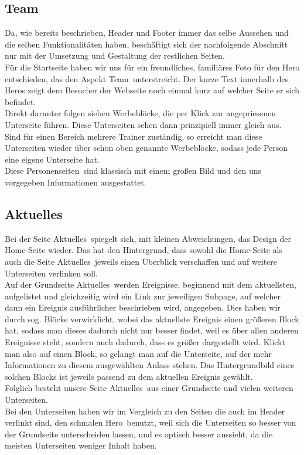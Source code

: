 \documentclass[12pt,a4paper]{article}
\begin{document}
\subsection{Team}
Da, wie bereits beschrieben, Header und Footer immer das selbe Aussehen und die selben Funktionalitäten haben, beschäftigt sich der nachfolgende Abschnitt nur mit der Umsetzung und Gestaltung der restlichen Seiten.\\
Für die Startseite haben wir uns für ein freundliches, familiäres Foto für den Hero entschieden, das den Aspekt \dq Team\dq \ unterstreicht.
Der kurze Text innerhalb des Heros zeigt dem Besucher der Webseite noch einmal kurz auf welcher Seite er sich befindet.\\
Direkt darunter folgen sieben Werbeblöcke, die per Klick zur angepriesenen Unterseite führen. Diese Unterseiten sehen dann prinzipiell immer gleich aus. Sind für einen Bereich mehrere Trainer zuständig, so erreicht man diese Unterseiten wieder über schon oben genannte Werbeblöcke, sodass jede Person eine eigene Unterseite hat.\\
Diese \dq Personenseiten\dq \ sind klassisch mit einem großen Bild und den uns vorgegeben Informationen ausgestattet.
\subsection{Aktuelles}
Bei der Seite \dq Aktuelles\dq \ spiegelt sich, mit kleinen Abweichungen, das Design der Home-Seite wieder. Das hat den Hintergrund, dass sowohl die Home-Seite als auch die Seite  \dq Aktuelles\dq \ jeweils einen Überblick verschaffen und auf weitere Unterseiten verlinken soll.\\
Auf der Grundseite \dq Aktuelles\dq \ werden Ereignisse, beginnend mit dem aktuellsten, aufgelistet und gleichzeitig wird ein Link zur jeweiligen Subpage, auf welcher dann ein Ereignis ausführlicher beschrieben wird, angegeben. Dies haben wir durch sog. Blöcke verwirklicht, wobei das aktuellste Ereignis einen größeren Block hat, sodass man dieses dadurch nicht nur besser findet, weil es über allen anderen Ereignisse steht, sondern auch dadurch, dass es größer dargestellt wird. Klickt man also auf einen Block, so gelangt man auf die Unterseite, auf der mehr Informationen zu diesem ausgewählten Anlass stehen. Das Hintergrundbild  eines solchen Blocks ist jeweils passend zu dem aktuellen Ereignis gewählt.\\
Folglich besteht unsere Seite \dq Aktuelles\dq \ aus einer Grundseite und vielen weiteren Unterseiten.\\
Bei den Unterseiten haben wir im Vergleich zu den Seiten die auch im Header verlinkt sind, den schmalen \dq Hero\dq \ benutzt, weil sich die Unterseiten so besser von der Grundseite unterscheiden lassen, und es optisch besser aussieht, da die meisten Unterseiten weniger Inhalt haben.
\end{document}
